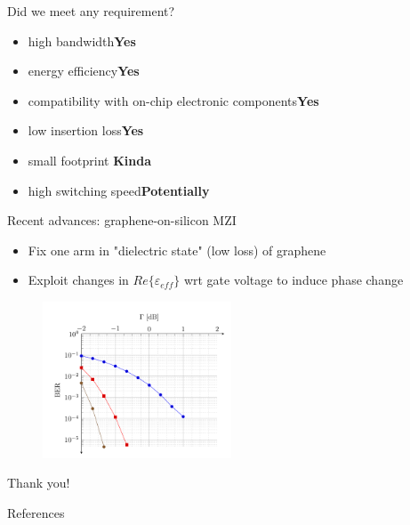 \documentclass[handout,xcolor={usenames,dvipsnames},11pt]{beamer}
\begin{document}
\begin{frame}{Did we meet any requirement?}
    \pause
    \begin{itemize}
        \item high bandwidth\pause\qquad \textcolor{TolLightGreen}{\textbf{Yes}}\pause
        \item energy efficiency\pause\qquad \textcolor{TolLightGreen}{\textbf{Yes}}\pause
    \item compatibility with on-chip electronic components\pause\quad \textcolor{TolLightGreen}{\textbf{Yes}}\pause
        \item low insertion loss\pause\qquad \textcolor{TolLightGreen}{\textbf{Yes}}\pause
        \item small footprint \pause\qquad \alert{\textbf{Kinda}} \pause
        \item high switching speed\pause\qquad \alert{\textbf{Potentially}}
    \end{itemize}
\end{frame}
\begin{frame}{Recent advances: graphene-on-silicon MZI}
    \begin{itemize}
        \item Fix one arm in "dielectric state" (low loss) of graphene
        \item Exploit changes in $Re\{ \varepsilon_{eff}\}$ wrt gate voltage to induce phase change
    \end{itemize}
    \begin{figure}
        \centering
        \includegraphics[width=0.5\textwidth]{./images/BER}
        \caption{\cite{Phatak2016}}
    \end{figure}
\end{frame}
\begin{frame}[standout]
    Thank you!
\end{frame}
\appendix

\begin{frame}[allowframebreaks]{References}

  
  

\end{frame}
\end{document}
